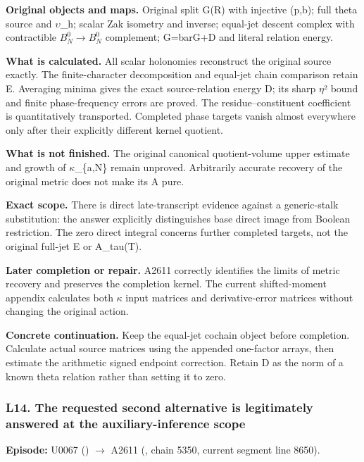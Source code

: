 \textbf{Original objects and maps.} Original split G(R) with injective
(p,b); full theta source and
\allowbreak{}\ensuremath{υ}\allowbreak{}\_h; scalar Zak isometry and
inverse; equal-jet descent complex with contractible \(B_N^0\to B_N^0\)
complement; G=barG+D and literal relation energy.

\textbf{What is calculated.} All scalar holonomies reconstruct the
original source exactly. The finite-character decomposition and
equal-jet chain comparison retain E. Averaging minima gives the exact
source-relation energy D; its sharp
\allowbreak{}\ensuremath{η}\allowbreak{}² bound and finite
phase-frequency errors are proved. The residue--constituent coefficient
is quantitatively transported. Completed phase targets vanish almost
everywhere only after their explicitly different kernel quotient.

\textbf{What is not finished.} The original canonical quotient-volume
upper estimate and growth of
\allowbreak{}\ensuremath{κ}\allowbreak{}\_\{a,N\} remain unproved.
Arbitrarily accurate recovery of the original metric does not make its A
pure.

\textbf{Exact scope.} There is direct late-transcript evidence against a
generic-stalk substitution: the answer explicitly distinguishes base
direct image from Boolean restriction. The zero direct integral concerns
further completed targets, not the original full-jet E or A\_tau(T).

\textbf{Later completion or repair.} A2611 correctly identifies the
limits of metric recovery and preserves the completion kernel. The
current shifted-moment appendix calculates both
\allowbreak{}\ensuremath{κ}\allowbreak{} input matrices and
derivative-error matrices without changing the original action.

\textbf{Concrete continuation.} Keep the equal-jet cochain object before
completion. Calculate actual source matrices using the appended
one-factor arrays, then estimate the arithmetic signed endpoint
correction. Retain D as the norm of a known theta relation rather than
setting it to zero.

\subsubsection{L14. The requested second alternative is legitimately
answered at the auxiliary-inference
scope}\label{l14.-the-requested-second-alternative-is-legitimately-answered-at-the-auxiliary-inference-scope}

\textbf{Episode:} U0067
(\protect{})
\allowbreak{}\ensuremath{→}\allowbreak{} A2611
(\protect{}, chain 5350,
current segment line 8650).

